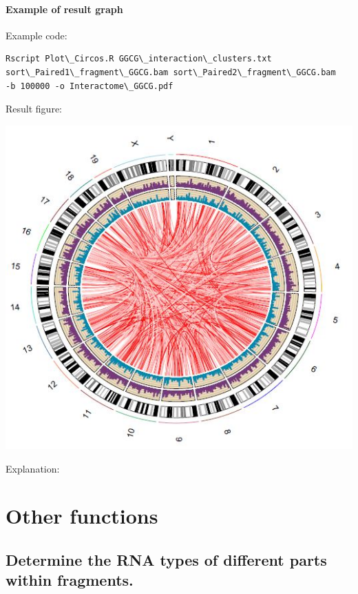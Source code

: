 \documentclass[letterpaper,10pt,english]{sphinxmanual}
\begin{document}
\paragraph{Example of result graph}
\label{Visualization:example-of-result-graph}
Example code:

\begin{Verbatim}[commandchars=\\\{\}]
Rscript Plot\_Circos.R GGCG\_interaction\_clusters.txt
sort\_Paired1\_fragment\_GGCG.bam sort\_Paired2\_fragment\_GGCG.bam
-b 100000 -o Interactome\_GGCG.pdf
\end{Verbatim}

Result figure:

\includegraphics{Interactome_GGCG.JPG}

Explanation:


\section{Other functions}
\label{Analysis_pipeline:other-functions}

\subsection{Determine the RNA types of different parts within fragments.}
\label{Analysis_pipeline:rna-types}\label{Analysis_pipeline:determine-the-rna-types-of-different-parts-within-fragments}
\end{document}

